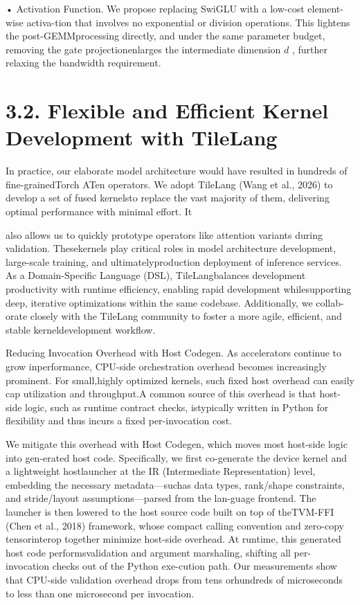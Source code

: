 \documentclass[
  10
]{article}
\begin{document}
• Activation Function. We propose replacing SwiGLU with a low-cost
element-wise activa-tion that involves no exponential or division
operations. This lightens the post-GEMMprocessing directly, and under
the same parameter budget, removing the gate projectionenlarges the
intermediate dimension \(d\) , further relaxing the bandwidth
requirement.

\section{3.2. Flexible and Efficient Kernel Development with
TileLang}\label{flexible-and-efficient-kernel-development-with-tilelang}

In practice, our elaborate model architecture would have resulted in
hundreds of fine-grainedTorch ATen operators. We adopt TileLang (Wang et
al., 2026) to develop a set of fused kernelsto replace the vast majority
of them, delivering optimal performance with minimal effort. It

also allows us to quickly prototype operators like attention variants
during validation. Thesekernels play critical roles in model
architecture development, large-scale training, and ultimatelyproduction
deployment of inference services. As a Domain-Specific Language (DSL),
TileLangbalances development productivity with runtime efficiency,
enabling rapid development whilesupporting deep, iterative optimizations
within the same codebase. Additionally, we collab-orate closely with the
TileLang community to foster a more agile, efficient, and stable
kerneldevelopment workflow.

Reducing Invocation Overhead with Host Codegen. As accelerators continue
to grow inperformance, CPU-side orchestration overhead becomes
increasingly prominent. For small,highly optimized kernels, such fixed
host overhead can easily cap utilization and throughput.A common source
of this overhead is that host-side logic, such as runtime contract
checks, istypically written in Python for flexibility and thus incurs a
fixed per-invocation cost.

We mitigate this overhead with Host Codegen, which moves most host-side
logic into gen-erated host code. Specifically, we first co-generate the
device kernel and a lightweight hostlauncher at the IR (Intermediate
Representation) level, embedding the necessary metadata---suchas data
types, rank/shape constraints, and stride/layout assumptions---parsed
from the lan-guage frontend. The launcher is then lowered to the host
source code built on top of theTVM-FFI (Chen et al., 2018) framework,
whose compact calling convention and zero-copy tensorinterop together
minimize host-side overhead. At runtime, this generated host code
performsvalidation and argument marshaling, shifting all per-invocation
checks out of the Python exe-cution path. Our measurements show that
CPU-side validation overhead drops from tens orhundreds of microseconds
to less than one microsecond per invocation.
\end{document}
